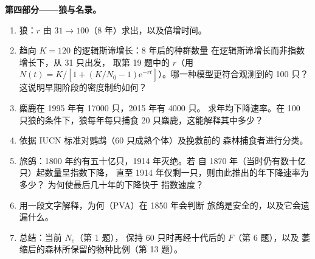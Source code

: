 \begin{problem}
\medskip
\noindent\textbf{第四部分——狼与名录。}
\begin{enumerate}[resume]
  \item 狼：$r$ 由 $31 \to 100$（8 年）求出，以及倍增时间。
  \item 趋向 $K = 120$ 的逻辑斯谛增长：8 年后的种群数量
        在逻辑斯谛增长而非指数增长下，从 31 只出发，
        取第 19 题中的 $r$（用 $N(t) = K/[1 + (K/N_{0} -
        1)\mathrm{e}^{-rt}]$）。哪一种模型更符合观测到的 100 只？
        这说明早期阶段的密度制约如何？
  \item 麋鹿在 1995 年有 \num{17000} 只，2015 年有 \num{4000} 只。
        求年均下降速率。在 100 只狼的条件下，狼每年每只捕食
        \num{20} 只麋鹿，这能解释其中多少？
  \item 依据 IUCN 标准对鹦鹉（60 只成熟个体）及挽救前的
        森林捕食者进行分类。
  \item 旅鸽：1800 年约有五十亿只，1914 年灭绝。若
        自 1870 年（当时仍有数十亿只）起数量呈指数下降，
        直至 1914 年仅剩一只，则由此推出的年下降速率为多少？
        为何使最后几十年的下降快于
        指数速度？
  \item 用一段文字解释，为何（PVA）在 1850 年会判断
        旅鸽是安全的，以及它会遗漏什么。
  \item 总结：当前 $N_{e}$（第 1 题），
        保持 60 只时再经十代后的 $F$（第 6 题），以及
        萎缩后的森林所保留的物种比例（第 13 题）。
\end{enumerate}
\end{problem}
